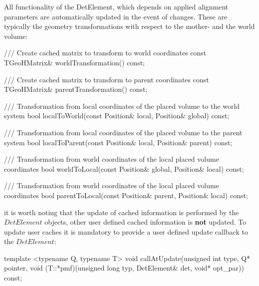 \documentclass[10pt,a4paper]{article}
\begin{document}
\noindent
All functionality of the DetElement, which depends on applied alignment parameters
are automatically updated in the event of changes. These are typically the geometry 
transformations with respect to the mother- and the world volume:
\begin{code}
      /// Create cached matrix to transform to world coordinates
      const TGeoHMatrix& worldTransformation() const;

      /// Create cached matrix to transform to parent coordinates
      const TGeoHMatrix& parentTransformation() const;
 
      /// Transformation from local coordinates of the placed volume to the world system
      bool localToWorld(const Position& local, Position& global) const;

      /// Transformation from local coordinates of the placed volume to the parent system
      bool localToParent(const Position& local, Position& parent) const;

      /// Transformation from world coordinates of the local placed volume coordinates
      bool worldToLocal(const Position& global, Position& local) const;

      /// Transformation from world coordinates of the local placed volume coordinates
      bool parentToLocal(const Position& parent, Position& local) const;
\end{code}
it is worth noting that the update of cached information is performed by the $DetElement$ 
objects, other user defined cached information is {\bf{not}} updated. To update 
user caches it is mandatory to provide a user defined update callback to the $DetElement$:
\begin{code}
    template <typename Q, typename T> 
    void callAtUpdate(unsigned int type, Q* pointer, 
                      void (T::*pmf)(unsigned long typ, DetElement& det, void* opt_par)) const;
\end{code}
\end{document}
